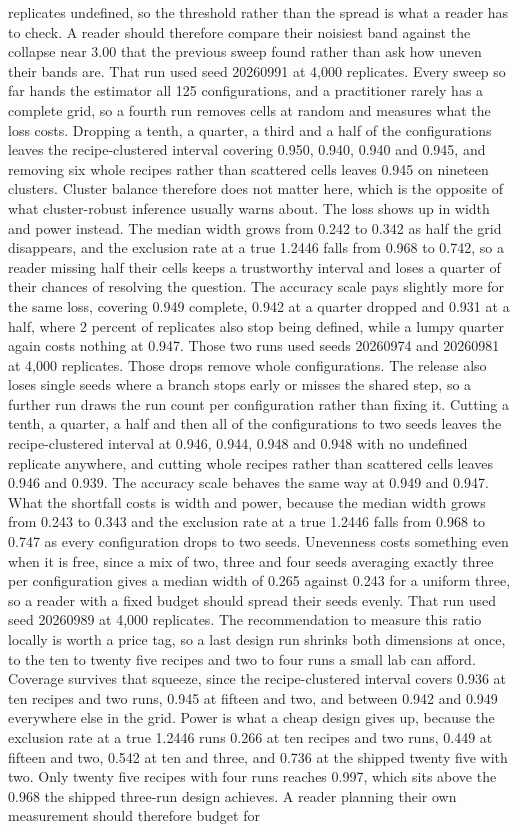 replicates undefined, so the threshold rather than the spread is what a reader has to check. A reader should therefore compare their noisiest band against the collapse near 3.00 that the previous sweep found rather than ask how uneven their bands are. That run used seed 20260991 at 4,000 replicates. Every sweep so far hands the estimator all 125 configurations, and a practitioner rarely has a complete grid, so a fourth run removes cells at random and measures what the loss costs. Dropping a tenth, a quarter, a third and a half of the configurations leaves the recipe-clustered interval covering 0.950, 0.940, 0.940 and 0.945, and removing six whole recipes rather than scattered cells leaves 0.945 on nineteen clusters. Cluster balance therefore does not matter here, which is the opposite of what cluster-robust inference usually warns about. The loss shows up in width and power instead. The median width grows from 0.242 to 0.342 as half the grid disappears, and the exclusion rate at a true 1.2446 falls from 0.968 to 0.742, so a reader missing half their cells keeps a trustworthy interval and loses a quarter of their chances of resolving the question. The accuracy scale pays slightly more for the same loss, covering 0.949 complete, 0.942 at a quarter dropped and 0.931 at a half, where 2 percent of replicates also stop being defined, while a lumpy quarter again costs nothing at 0.947. Those two runs used seeds 20260974 and 20260981 at 4,000 replicates. Those drops remove whole configurations. The release also loses single seeds where a branch stops early or misses the shared step, so a further run draws the run count per configuration rather than fixing it. Cutting a tenth, a quarter, a half and then all of the configurations to two seeds leaves the recipe-clustered interval at 0.946, 0.944, 0.948 and 0.948 with no undefined replicate anywhere, and cutting whole recipes rather than scattered cells leaves 0.946 and 0.939. The accuracy scale behaves the same way at 0.949 and 0.947. What the shortfall costs is width and power, because the median width grows from 0.243 to 0.343 and the exclusion rate at a true 1.2446 falls from 0.968 to 0.747 as every configuration drops to two seeds. Unevenness costs something even when it is free, since a mix of two, three and four seeds averaging exactly three per configuration gives a median width of 0.265 against 0.243 for a uniform three, so a reader with a fixed budget should spread their seeds evenly. That run used seed 20260989 at 4,000 replicates. The recommendation to measure this ratio locally is worth a price tag, so a last design run shrinks both dimensions at once, to the ten to twenty five recipes and two to four runs a small lab can afford. Coverage survives that squeeze, since the recipe-clustered interval covers 0.936 at ten recipes and two runs, 0.945 at fifteen and two, and between 0.942 and 0.949 everywhere else in the grid. Power is what a cheap design gives up, because the exclusion rate at a true 1.2446 runs 0.266 at ten recipes and two runs, 0.449 at fifteen and two, 0.542 at ten and three, and 0.736 at the shipped twenty five with two. Only twenty five recipes with four runs reaches 0.997, which sits above the 0.968 the shipped three-run design achieves. A reader planning their own measurement should therefore budget for 